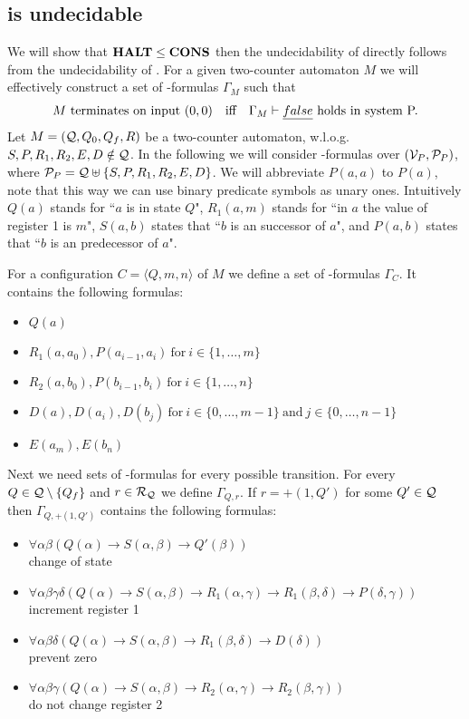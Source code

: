 \subsection{\PCons{} is undecidable}
We will show that $\textbf{HALT}\leq\textbf{CONS}$ then the undecidability of \PCons{} directly follows from the undecidability of \autHalt. For a given two-counter automaton $M$ we will effectively construct a set of \SysP-formulas $\Gamma_M$ such that
\begin{align*}
 & \text{$M$ terminates on input $(0,0)$} &   & \text{iff} & \text{$\Gamma_M\vdash\emph{false}$ holds in system P.} 
\end{align*}
Let $M=(\mathcal{Q},Q_0,Q_f,R)$ be a two-counter automaton, w.l.o.g. $S,P,R_1,R_2,E,D\notin\mathcal{Q}$. In the following we will consider \SysP-formulas over $(\mathcal{V}_P,\mathcal{P}_P)$, where $\mathcal{P}_P=\mathcal{Q}\uplus\{S,P,R_1,R_2,E,D\}$. We will abbreviate $P(a,a)$ to $P(a)$, note that this way we can use binary predicate symbols as unary ones. Intuitively $Q(a)$ stands for ``$a$ is in state $Q$", $R_1(a,m)$ stands for ``in $a$ the value of register 1 is $m$", $S(a,b)$ states that ``$b$ is an successor of $a$", and $P(a,b)$ states that ``$b$ is an predecessor of $a$".

For a configuration $C=\langle Q,m,n\rangle$ of $M$ we define a set of \SysP-formulas $\Gamma_C$. It contains the following formulas:
\begin{itemize}
	\item $Q(a)$
	\item $R_1(a,a_0),P(a_{i-1},a_i)~\text{for}~i\in\{1,\dots,m\}$
	\item $R_2(a,b_0),P(b_{i-1},b_i)~\text{for}~i\in\{1,\dots,n\}$
	\item $D(a),D(a_i),D(b_j)~\text{for}~i\in\{0,\dots,m-1\}~\text{and}~j\in\{0,\dots,n-1\}$
	\item $E(a_m),E(b_n)$
\end{itemize}
Next we need sets of \SysP-formulas for every possible transition.
For every $Q\in\mathcal{Q}\setminus\{Q_f\}$ and $r\in\mathcal{R}_{\mathcal{Q}}$ we define $\Gamma_{Q,r}$.
If $r=+(1,Q')$ for some $Q'\in\mathcal{Q}$ then $\Gamma_{Q,+(1,Q')}$ contains the following formulas:
\begin{itemize}
	\item $\forall\alpha\beta(Q(\alpha)\to S(\alpha,\beta)\to Q'(\beta))$ \\change of state
	\item $\forall\alpha\beta\gamma\delta(Q(\alpha)\to S(\alpha,\beta)\to R_1(\alpha,\gamma)\to R_1(\beta,\delta)\to P(\delta,\gamma))$\\increment register 1
	\item $\forall\alpha\beta\delta(Q(\alpha)\to S(\alpha,\beta)\to R_1(\beta,\delta)\to D(\delta))$ \\prevent zero
	\item $\forall\alpha\beta\gamma(Q(\alpha)\to S(\alpha,\beta)\to R_2(\alpha,\gamma)\to R_2(\beta,\gamma))$ \\do not change register 2
\end{itemize}

